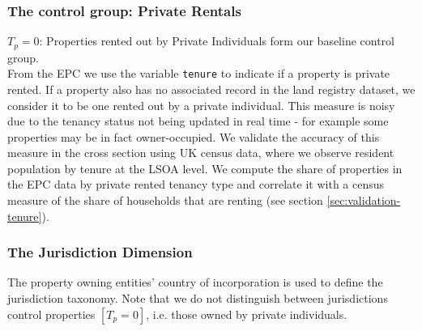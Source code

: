 \documentclass[12pt]{article}
\begin{document}
\subsubsection{The control group: Private Rentals}
    $T_p = 0$: Properties rented out by  Private Individuals form our baseline control group. \\
    From the EPC we use the variable \texttt{tenure} to indicate if a property is private rented. If a property also has no associated record in the land registry dataset, we consider it to be one rented out by a private individual. This measure is noisy due to the tenancy status not being updated in real time - for example some properties may be in fact owner-occupied. We validate the accuracy of this measure in the cross section using UK census data, where we observe resident population by tenure at the LSOA level. We compute the share of properties in the EPC data by private rented tenancy type and correlate it with a census measure of the share of households that are renting (see section \ref{sec:validation-tenure}). \\

\subsubsection{The Jurisdiction Dimension}
The property owning entities' country of incorporation is used to define the jurisdiction taxonomy. Note that we do not distinguish between jurisdictions control properties $[T_p = 0]$, i.e. those owned by private individuals.
\end{document}
